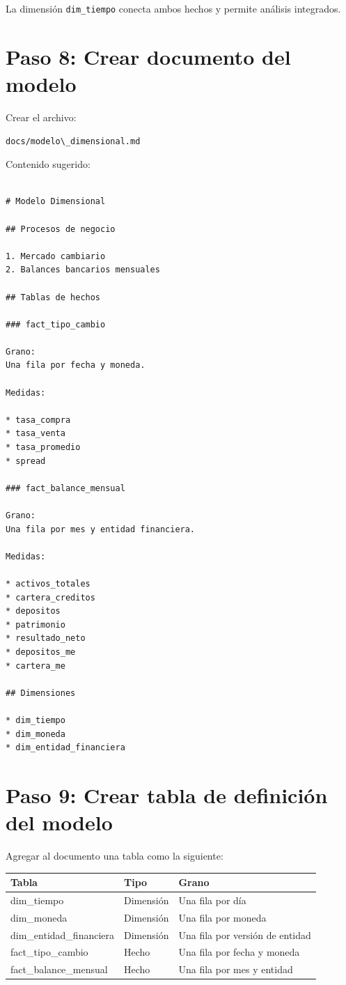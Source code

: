 La dimensión \texttt{dim\_tiempo} conecta ambos hechos y permite análisis integrados.

\section{Paso 8: Crear documento del modelo}

Crear el archivo:

\begin{verbatim}
docs/modelo\_dimensional.md
\end{verbatim}

Contenido sugerido:

\begin{verbatim}

# Modelo Dimensional

## Procesos de negocio

1. Mercado cambiario
2. Balances bancarios mensuales

## Tablas de hechos

### fact_tipo_cambio

Grano:
Una fila por fecha y moneda.

Medidas:

* tasa_compra
* tasa_venta
* tasa_promedio
* spread

### fact_balance_mensual

Grano:
Una fila por mes y entidad financiera.

Medidas:

* activos_totales
* cartera_creditos
* depositos
* patrimonio
* resultado_neto
* depositos_me
* cartera_me

## Dimensiones

* dim_tiempo
* dim_moneda
* dim_entidad_financiera
  \end{verbatim}

\section{Paso 9: Crear tabla de definición del modelo}

Agregar al documento una tabla como la siguiente:

\begin{center}
\begin{tabular}{lll}
\toprule
Tabla & Tipo & Grano \\
\midrule
dim\_tiempo & Dimensión & Una fila por día \\
dim\_moneda & Dimensión & Una fila por moneda \\
dim\_entidad\_financiera & Dimensión & Una fila por versión de entidad \\
fact\_tipo\_cambio & Hecho & Una fila por fecha y moneda \\
fact\_balance\_mensual & Hecho & Una fila por mes y entidad \\
\bottomrule
\end{tabular}
\end{center}

